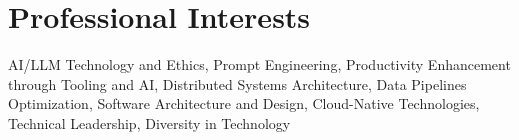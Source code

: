 
\section{Professional Interests}
\footnotesize{AI/LLM Technology and Ethics, Prompt Engineering, Productivity Enhancement through Tooling
    and AI, Distributed Systems Architecture, Data Pipelines Optimization, Software Architecture and
    Design, Cloud-Native Technologies, Technical Leadership, Diversity in Technology}